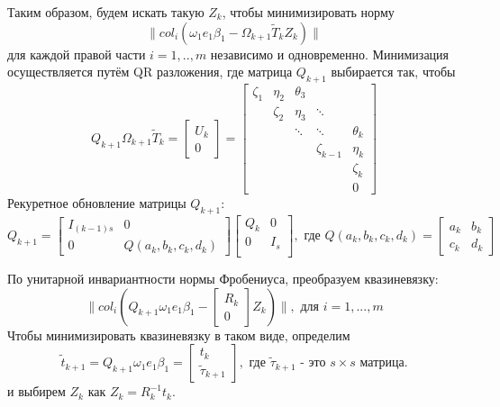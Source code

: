 Таким образом, будем искать такую $Z_k$, чтобы минимизировать норму 
$$\| col_i(\omega_1 e_1 \beta_1 - \Omega_{k+1} \tilde{T}_k Z_k) \|$$
для каждой правой части $i=1,..,m$ независимо и одновременно. Минимизация осуществляется
путём QR разложения, где матрица $Q_{k+1}$ выбирается так, чтобы 
$$Q_{k+1} \Omega_{k+1} \tilde{T}_k = \begin{bmatrix}
                                        U_k \\
                                        0
                                     \end{bmatrix} =  \begin{bmatrix}
                                                          \zeta_1 & \eta_2 & \theta_3 & & \\
                                                          & \zeta_2 & \eta_3 & \ddots & \\
                                                          & & \ddots & \ddots & \theta_k \\
                                                          & & & \zeta_{k-1} & \eta_{k} \\
                                                          & & & & \zeta_k \\
                                                          & & & & 0
                                                      \end{bmatrix}$$ 
Рекуретное обновление матрицы $Q_{k+1}$:
$$Q_{k+1} = \begin{bmatrix}
                I_{(k-1)s} & 0 \\
                0          & Q(a_k,b_k,c_k,d_k)
            \end{bmatrix} \begin{bmatrix}
                                Q_k & 0 \\
                                0   & I_s \\ 
                            \end{bmatrix}, \text{ где } Q(a_k, b_k, c_k, d_k) = \begin{bmatrix}
                                                                                    a_k & b_k \\
                                                                                    c_k & d_k
                                                                                \end{bmatrix} $$

По унитарной инвариантности нормы Фробениуса, преобразуем квазиневязку:
$$\| col_i \left( Q_{k+1} \omega_1 e_1 \beta_1 - \begin{bmatrix} R_k \\ 0 \end{bmatrix} Z_k \right) \|, \text{ для } i=1,...,m$$
Чтобы минимизировать квазиневязку в таком виде, определим 
$$ \tilde{t}_{k+1} = Q_{k+1} \omega_1 e_1 \beta_1 = \begin{bmatrix} t_k \\ \tilde{\tau}_{k+1} \end{bmatrix}, \text{ где } \tilde{\tau}_{k+1} \text{ - это } s \times s \text{ матрица.} $$ 
и выбирем $Z_k$ как $Z_k = R_k^{-1} t_k$.

